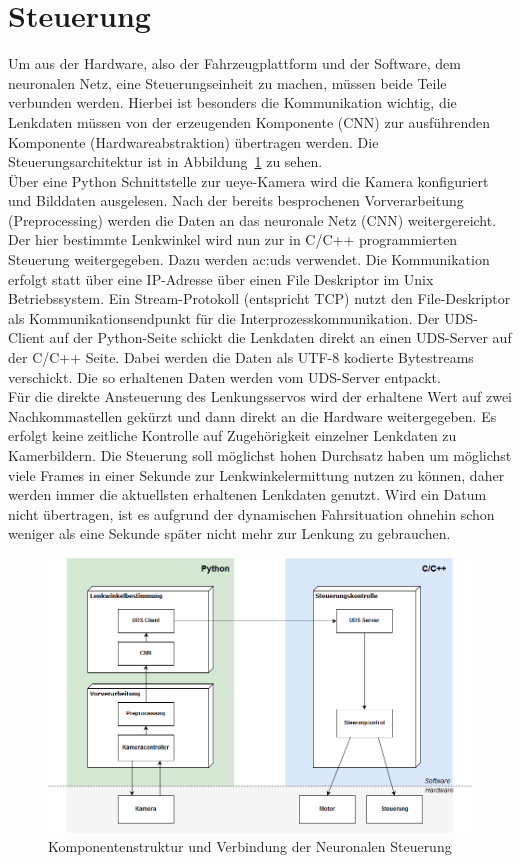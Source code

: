 \newpage

\section{Steuerung}

Um aus der Hardware, also der Fahrzeugplattform und der Software, dem neuronalen Netz, eine Steuerungseinheit zu machen, müssen beide Teile verbunden werden. Hierbei ist besonders die Kommunikation wichtig, die Lenkdaten müssen von der erzeugenden Komponente (CNN) zur ausführenden Komponente (Hardwareabstraktion) übertragen werden. Die Steuerungsarchitektur ist in Abbildung~\ref{fig:steuerung} zu sehen.\\
Über eine Python Schnittstelle zur ueye-Kamera wird die Kamera konfiguriert und Bilddaten ausgelesen. Nach der bereits besprochenen Vorverarbeitung (Preprocessing) werden die Daten an das neuronale Netz (CNN) weitergereicht.\\ 
Der hier bestimmte Lenkwinkel wird nun zur in C/C++ programmierten Steuerung weitergegeben. Dazu werden \gls{ac:uds} verwendet. Die Kommunikation erfolgt statt über eine IP-Adresse über einen File Deskriptor im Unix Betriebssystem. Ein Stream-Protokoll (entspricht TCP) nutzt den File-Deskriptor als Kommunikationsendpunkt für die Interprozesskommunikation. Der UDS-Client auf der Python-Seite schickt die Lenkdaten direkt an einen UDS-Server auf der C/C++ Seite. Dabei werden die Daten als UTF-8 kodierte Bytestreams verschickt. Die so erhaltenen Daten werden vom UDS-Server entpackt.\\
Für die direkte Ansteuerung des Lenkungsservos wird der erhaltene Wert auf zwei Nachkommastellen gekürzt und dann direkt an die Hardware weitergegeben. Es erfolgt keine zeitliche Kontrolle auf Zugehörigkeit einzelner Lenkdaten zu Kamerbildern. Die Steuerung soll möglichst hohen Durchsatz haben um möglichst viele Frames in einer Sekunde zur Lenkwinkelermittung nutzen zu können, daher werden immer die aktuellsten erhaltenen Lenkdaten genutzt. Wird ein Datum nicht übertragen, ist es aufgrund der dynamischen Fahrsituation ohnehin schon weniger als eine Sekunde später nicht mehr zur Lenkung zu gebrauchen.

\begin{figure}[h]
	\centering
	\includegraphics[width=\linewidth]{figures/Steuerung.png}
	\caption{Komponentenstruktur und Verbindung der Neuronalen Steuerung}
	\label{fig:steuerung}
\end{figure}

